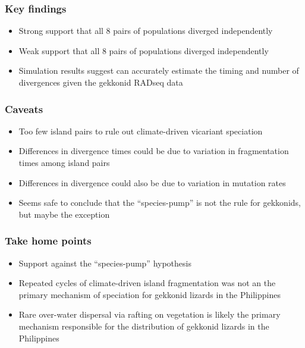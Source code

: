 \begin{frame}
    \frametitle{Key findings}
    \begin{itemize}
        \item<1-> Strong support that all 8 pairs of 
            populations diverged independently
        \item<2-> Weak support that all 8 pairs of  populations
            diverged independently
        \item<3-> Simulation results suggest \ecoevolity can accurately
            estimate the timing and number of divergences given the gekkonid
            RADseq data
    \end{itemize}
\end{frame}

\begin{frame}
    \frametitle{Caveats}
    \begin{itemize}
        \item Too few island pairs to rule out climate-driven vicariant
            speciation
        \item Differences in divergence times could be due to variation in
            fragmentation times among island pairs
        \item Differences in divergence could also be due to variation
            in mutation rates
    \end{itemize}

    \vspace{1cm}
    \begin{itemize}
        \item<2-> Seems safe to conclude that the ``species-pump'' is not the
            rule for gekkonids, but maybe the exception
    \end{itemize}
\end{frame}

\begin{frame}
    \frametitle{Take home points}
    \begin{itemize}
        \item<1-> Support against the ``species-pump'' hypothesis
        \item<2-> Repeated cycles of climate-driven island fragmentation was
            not an the primary mechanism of speciation for gekkonid lizards in
            the Philippines
        \item<3-> Rare over-water dispersal via rafting on vegetation
            is likely the primary mechanism responsible for the distribution
            of gekkonid lizards in the Philippines
    \end{itemize}
\end{frame}
